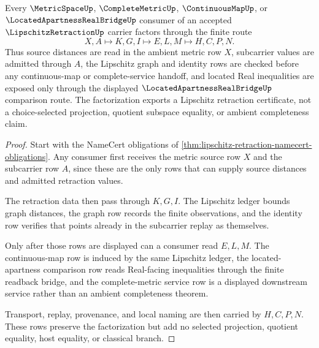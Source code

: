 \begin{theorem}
\label{thm:lipschitz-retraction-metric-factorization}
Every $\MetricSpaceUp$, $\CompleteMetricUp$, $\ContinuousMapUp$, or $\LocatedApartnessRealBridgeUp$ consumer of an accepted $\LipschitzRetractionUp$ carrier factors through the finite route
$$
X,A \longmapsto K,G,I \longmapsto E,L,M \longmapsto H,C,P,N .
$$
Thus source distances are read in the ambient metric row $X$, subcarrier values are admitted through $A$, the Lipschitz graph and identity rows are checked before any continuous-map or complete-service handoff, and located Real inequalities are exposed only through the displayed $\LocatedApartnessRealBridgeUp$ comparison route. The factorization exports a Lipschitz retraction certificate, not a choice-selected projection, quotient subspace equality, or ambient completeness claim.
\end{theorem}
\begin{proof}
Start with the NameCert obligations of \autoref{thm:lipschitz-retraction-namecert-obligations}. Any consumer first receives the metric source row $X$ and the subcarrier row $A$, since these are the only rows that can supply source distances and admitted retraction values.

The retraction data then pass through $K,G,I$. The Lipschitz ledger bounds graph distances, the graph row records the finite observations, and the identity row verifies that points already in the subcarrier replay as themselves.

Only after those rows are displayed can a consumer read $E,L,M$. The continuous-map row is induced by the same Lipschitz ledger, the located-apartness comparison row reads Real-facing inequalities through the finite readback bridge, and the complete-metric service row is a displayed downstream service rather than an ambient completeness theorem.

Transport, replay, provenance, and local naming are then carried by $H,C,P,N$. These rows preserve the factorization but add no selected projection, quotient equality, host equality, or classical branch.
\end{proof}


